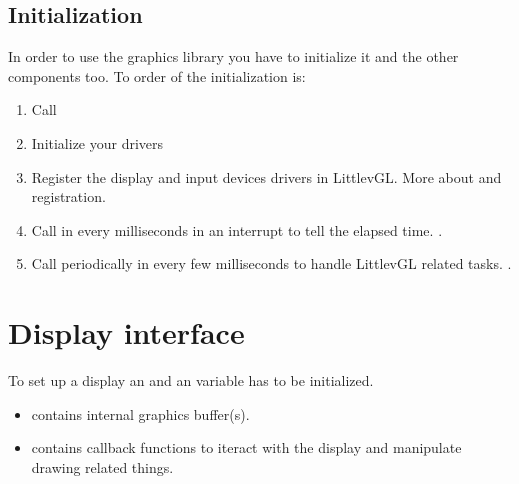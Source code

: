 \documentclass[letterpaper,10pt,english]{sphinxmanual}
\begin{document}
\subsection{Initialization}
\label{\detokenize{porting/project:initialization}}
In order to use the graphics library you have to initialize it and the other components too. To order of the initialization is:
\begin{enumerate}
\def\theenumi{\arabic{enumi}}
\def\labelenumi{\theenumi .}
\makeatletter\def\p@enumii{\p@enumi \theenumi .}\makeatother
\item {} 
Call 

\item {} 
Initialize your drivers

\item {} 
Register the display and input devices drivers in LittlevGL.  More about {\hyperref[\detokenize{porting/display::doc}]{}} and {\hyperref[\detokenize{porting/indev::doc}]{}} registration.

\item {} 
Call  in every  milliseconds in an interrupt to tell the elapsed time. {\hyperref[\detokenize{porting/tick::doc}]{}}.

\item {} 
Call  periodically in every few milliseconds to handle LittlevGL related tasks. {\hyperref[\detokenize{porting/task-handler::doc}]{}}.

\end{enumerate}


\section{Display interface}
\label{\detokenize{porting/display:display-interface}}\label{\detokenize{porting/display::doc}}
To set up a display an  and an  variable has to be initialized.
\begin{itemize}
\item {} 
 contains internal graphics buffer(s).

\item {} 
 contains callback functions to iteract with the display and manipulate drawing related things.

\end{itemize}
\end{document}
